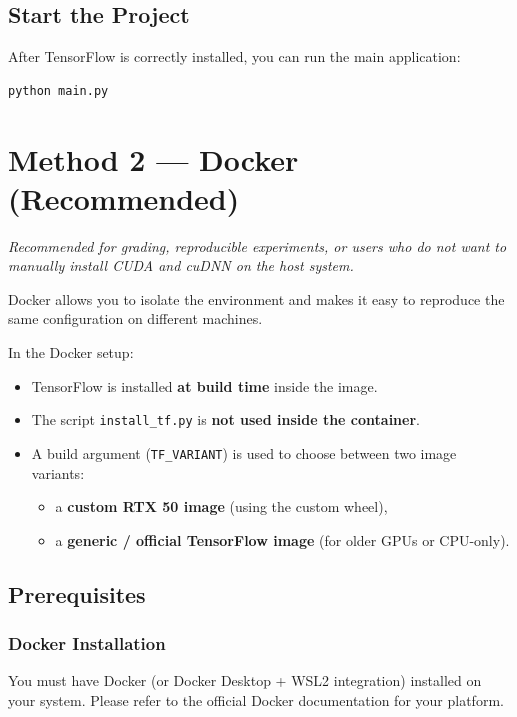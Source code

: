 \documentclass[a4paper,11pt]{article}
\begin{document}
\subsection{Start the Project}

After TensorFlow is correctly installed, you can run the main application:

\begin{lstlisting}[language=bash]
python main.py
\end{lstlisting}

\hrulefill
\section{Method 2 --- Docker (Recommended)}

\emph{Recommended for grading, reproducible experiments, or users who do not
want to manually install CUDA and cuDNN on the host system.}

Docker allows you to isolate the environment and makes it easy to
reproduce the same configuration on different machines.

In the Docker setup:
\begin{itemize}
  \item TensorFlow is installed \textbf{at build time} inside the image.
  \item The script \texttt{install\_tf.py} is \textbf{not used inside the container}.
  \item A build argument (\texttt{TF\_VARIANT}) is used to choose between two image variants:
    \begin{itemize}
      \item a \textbf{custom RTX 50 image} (using the custom wheel),
      \item a \textbf{generic / official TensorFlow image} (for older GPUs or CPU-only).
    \end{itemize}
\end{itemize}

\subsection{Prerequisites}

\subsubsection*{Docker Installation}

You must have Docker (or Docker Desktop + WSL2 integration) installed on
your system. Please refer to the official Docker documentation for your
platform.
\end{document}
